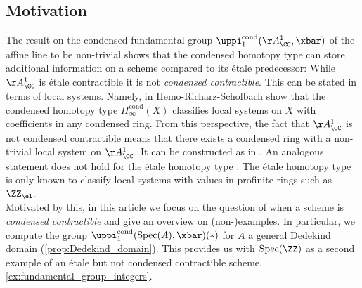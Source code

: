 \documentclass[leqno]{article}
\newcommand{\cond}{\mathrm{cond}}
\newcommand{\Picond}{\Pi_{\infty}^{\cond}}
\newcommand{\CondShape}[1]{\Picond(#1)}
\newcommand{\picond}{\uppi^{\cond}}
\renewcommand{\Spec}{\mathrm{Spec}}
\newcommand{\ZZell}{\ZZ_{\el}}
\begin{document}
\subsection*{Motivation}
The result on the condensed fundamental group  $\picond_1(\AA_{\CC}^1,\xbar)$ of the affine line to be non-trivial shows that the condensed homotopy type can store additional information on a scheme compared to its \'etale predecessor: While $\AA_{\CC}^1$ is \'etale contractible it is not \textit{condensed contractible}. This can be stated in terms of local systems. Namely, in \cite[Proposition A.1]{MR4609461} Hemo-Richarz-Scholbach show that the condensed homotopy type $\CondShape{X}$ classifies local systems on $X$ with coefficients in any condensed ring.
From this perspective, the fact that $\AA_{\CC}^1$ is not condensed contractible means that there exists a condensed ring with a non-trivial local system on $\AA_{\CC}^1$. It can be constructed as in \cite[Example 7.10]{The_condensed_homotopy_type}.
An analogous statement does not hold for the \'etale homotopy type \cite[Example 7.4.9]{MR3379634}. The \'etale homotopy type is only known to classify local systems with values in profinite rings such as $\ZZell$.\\
Motivated by this, in this article we focus on the question of when a scheme is \textit{condensed contractible} and give an overview on (non-)examples.
In particular, we compute the group $\picond_1(\Spec(A),\xbar)(\ast)$ for $A$ a general Dedekind domain (\cref{prop:Dedekind_domain}). This provides us with $\Spec(\ZZ)$ as a second example of an \'etale but not condensed contractible scheme, \cref{ex:fundamental_group_integers}.
%
\end{document}
